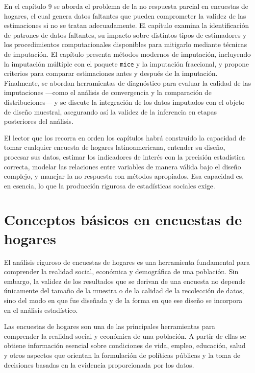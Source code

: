 \documentclass[
  spanish,
  12pt,
]{book}
\begin{document}
En el capítulo 9 se aborda el problema de la no respuesta parcial en encuestas de hogares, el cual genera datos faltantes que pueden comprometer la validez de las estimaciones si no se tratan adecuadamente. El capítulo examina la identificación de patrones de datos faltantes, su impacto sobre distintos tipos de estimadores y los procedimientos computacionales disponibles para mitigarlo mediante técnicas de imputación. El capítulo presenta métodos modernos de imputación, incluyendo la imputación múltiple con el paquete \texttt{mice} y la imputación fraccional, y propone criterios para comparar estimaciones antes y después de la imputación. Finalmente, se abordan herramientas de diagnóstico para evaluar la calidad de las imputaciones ---como el análisis de convergencia y la comparación de distribuciones--- y se discute la integración de los datos imputados con el objeto de diseño muestral, asegurando así la validez de la inferencia en etapas posteriores del análisis.

El lector que los recorra en orden los capítulos habrá construido la capacidad de tomar cualquier encuesta de hogares latinoamericana, entender su diseño, procesar sus datos, estimar los indicadores de interés con la precisión estadística correcta, modelar las relaciones entre variables de manera válida bajo el diseño complejo, y manejar la no respuesta con métodos apropiados. Esa capacidad es, en esencia, lo que la producción rigurosa de estadísticas sociales exige.

\chapter{Conceptos básicos en encuestas de hogares}\label{conceptos-buxe1sicos-en-encuestas-de-hogares}

El análisis riguroso de encuestas de hogares es una herramienta fundamental para comprender la realidad social, económica y demográfica de una población. Sin embargo, la validez de los resultados que se derivan de una encuesta no depende únicamente del tamaño de la muestra o de la calidad de la recolección de datos, sino del modo en que fue diseñada y de la forma en que ese diseño se incorpora en el análisis estadístico.

Las encuestas de hogares son una de las principales herramientas para comprender la realidad social y económica de una población. A partir de ellas se obtiene información esencial sobre condiciones de vida, empleo, educación, salud y otros aspectos que orientan la formulación de políticas públicas y la toma de decisiones basadas en la evidencia proporcionada por los datos.
\end{document}
